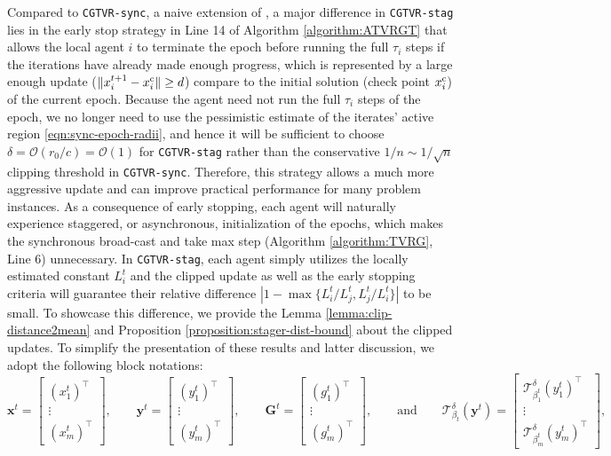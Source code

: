 \documentclass{article}
\newcommand{\cO}{\mathcal{O}}
\newcommand{\ctdb}{\mathcal{T}^\delta_{\beta_t}}
\newcommand{\bGt}{\mathbf{G}^t}
\newcommand{\bxt}{\mathbf{x}^t}
\newcommand{\byt}{\mathbf{y}^t}
\begin{document}
Compared to \texttt{CGTVR-sync}, a naive extension of \cite{sun2020improving,xin2020near}, a major difference in \texttt{CGTVR-stag} lies in the early stop strategy in Line 14 of Algorithm \ref{algorithm:ATVRGT} that allows the local agent $i$ to terminate the epoch before running the full $\tau_i$ steps if the iterations have already made enough progress, which is represented by a large enough update ($\|x_i^{t+1}-{x}_i^{\rm c}\| \geq d$) compare to the initial solution (check point ${x}_i^{\rm c}$) of the current epoch. Because the agent need not run the full $\tau_i$ steps of the epoch, we no longer need to use the pessimistic estimate of the iterates' active region \eqref{eqn:sync-epoch-radii}, and hence it will be sufficient to choose $\delta  = \cO(r_0/c) = \cO(1)$ for \texttt{CGTVR-stag} rather than the conservative $1/n\sim1/\sqrt{n}$ clipping threshold in \texttt{CGTVR-sync}. Therefore, this strategy allows a much more aggressive update and can improve practical performance for many problem instances.  As a consequence of early stopping, each agent will naturally experience staggered, or asynchronous, initialization of the epochs, which makes the synchronous broad-cast and take max step (Algorithm \ref{algorithm:TVRG}, Line 6) unnecessary. In \texttt{CGTVR-stag}, each agent simply utilizes the locally estimated constant $L_i^t$ and the clipped update as well as the early stopping criteria will guarantee their relative difference $|1-\max\{ {L_i^t}/{L_j^t}, {L_j^t}/{L_i^t}\}|$ to be small. To showcase this difference, we provide the Lemma \ref{lemma:clip-distance2mean} and Proposition \ref{proposition:stager-dist-bound} about the clipped updates. To simplify the presentation of these results and latter discussion, we adopt the following block notations: 
\begin{equation}
    \label{defn:block-notation}
     \bxt = \begin{bmatrix}
    (x_1^t)^\top\\
    \vdots\\
    (x_m^t)^\top
\end{bmatrix}, \qquad \byt = \begin{bmatrix}
    (y_1^t)^\top\\
    \vdots\\
    (y_m^t)^\top
\end{bmatrix}, \qquad \bGt = \begin{bmatrix}
    ({g}_1^t)^\top\\
    \vdots\\
    ({g}_m^t)^\top
\end{bmatrix}, \qquad\mbox{and}\qquad\ctdb(\byt)=\begin{bmatrix}
    \mathcal{T}^\delta_{\beta_1^t}(y_1^t)^\top\\
    \vdots\\
    \mathcal{T}^\delta_{\beta_m^t}(y_m^t)^\top
\end{bmatrix}, 
\end{equation}
\end{document}
